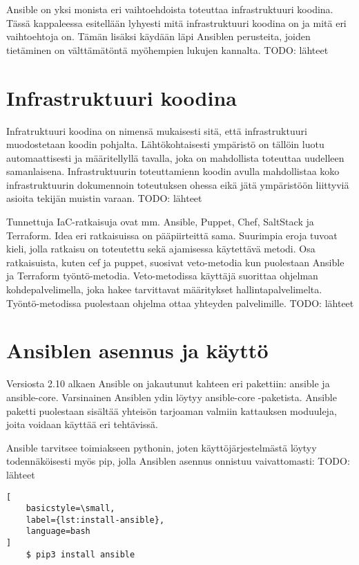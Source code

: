 Ansible on yksi monista eri vaihtoehdoista toteuttaa infrastruktuuri koodina.
Tässä kappaleessa esitellään lyhyesti mitä infrastruktuuri koodina on ja
mitä eri vaihtoehtoja on. Tämän lisäksi käydään läpi Ansiblen perusteita,
joiden tietäminen on välttämätöntä myöhempien lukujen kannalta.
TODO: lähteet

\section{Infrastruktuuri koodina}

Infratruktuuri koodina on nimensä mukaisesti sitä, että infrastruktuuri
muodostetaan koodin pohjalta. Lähtökohtaisesti ympäristö on tällöin
luotu automaattisesti ja määritellyllä tavalla, joka on mahdollista
toteuttaa uudelleen samanlaisena. Infrastruktuurin toteuttamienn koodin
avulla mahdollistaa koko infrastruktuurin dokumennoin toteutuksen ohessa
eikä jätä ympäristöön liittyviä asioita tekijän muistin varaan.
TODO: lähteet

Tunnettuja IaC-ratkaisuja ovat mm. Ansible, Puppet, Chef, SaltStack ja
Terraform. Idea eri ratkaisuissa on pääpiirteittä sama. Suurimpia eroja
tuvoat kieli, jolla ratkaisu on toteutettu sekä ajamisessa käytettävä
metodi. Osa ratkaisuista, kuten cef ja puppet, suosivat veto-metodia
kun puolestaan Ansible ja Terraform työntö-metodia. Veto-metodissa
käyttäjä suorittaa ohjelman kohdepalvelimella, joka hakee tarvittavat
määritykset hallintapalvelimelta. Työntö-metodissa puolestaan ohjelma
ottaa yhteyden palvelimille.
TODO: lähteet

\section{Ansiblen asennus ja käyttö}

Versiosta 2.10 alkaen Ansible on jakautunut kahteen eri pakettiin:
ansible ja ansible-core. Varsinainen Ansiblen ydin löytyy ansible-core
-paketista. Ansible paketti puolestaan sisältää yhteisön tarjoaman
valmiin kattauksen moduuleja, joita voidaan käyttää eri tehtävissä.
\parencite{AnsibleDocs}

Ansible tarvitsee toimiakseen pythonin, joten käyttöjärjestelmästä
löytyy todennäköisesti myös pip, jolla Ansiblen asennus onnistuu
vaivattomasti:
TODO: lähteet

\begin{lstlisting}[
    basicstyle=\small,
    label={lst:install-ansible},
    language=bash
]
    $ pip3 install ansible
\end{lstlisting}

